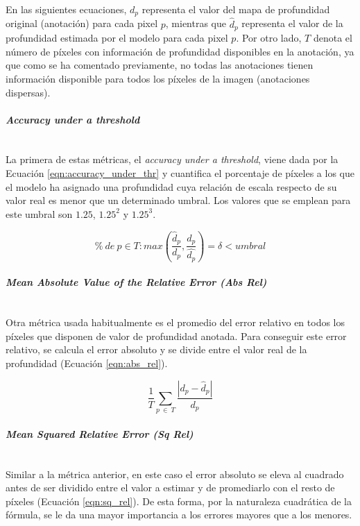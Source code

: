 En las siguientes ecuaciones, $d_p$ representa el valor del mapa de profundidad original (anotación) para cada pixel $p$, mientras que $\hat{d}_p$ representa el valor de la profundidad estimada por el modelo para cada pixel $p$. Por otro lado, $T$ denota el número de píxeles con información de profundidad disponibles en la anotación, ya que como se ha comentado previamente, no todas las anotaciones tienen información disponible para todos los píxeles de la imagen (anotaciones dispersas).


\paragraph{\textit{Accuracy under a threshold}}\mbox{}\\
La primera de estas métricas, el \textit{accuracy under a threshold}, viene dada por la Ecuación \ref{eqn:accuracy_under_thr} y cuantifica el porcentaje de píxeles a los que el modelo ha asignado una profundidad cuya relación de escala respecto de su valor real es menor que un determinado umbral. Los valores que se emplean para este umbral son $1.25$, $1.25^2$ y $1.25^3$.

\begin{equation}
\label{eqn:accuracy_under_thr}
\% \ de \ p \in T : max(\frac{\hat{d}_p}{d_p},\frac{d_p}{\hat{d_p}}) = \delta < umbral 
\end{equation}

\paragraph{\textit{Mean Absolute Value of the Relative Error (Abs Rel)}}\mbox{}\\
Otra métrica usada habitualmente es el promedio del error relativo en todos los píxeles que disponen de valor de profundidad anotada. Para conseguir este error relativo, se calcula el error absoluto y se divide entre el valor real de la profundidad (Ecuación \ref{eqn:abs_rel}).

\begin{equation}
\label{eqn:abs_rel}
\frac{1}{T}\sum_{p\ \in\ T} \frac{|d_p - \hat{d}_p|}{d_p}
\end{equation}

\paragraph{\textit{Mean Squared Relative Error (Sq Rel)}}\mbox{}\\
Similar a la métrica anterior, en este caso el error absoluto se eleva al cuadrado antes de ser dividido entre el valor a estimar y de promediarlo con el resto de píxeles (Ecuación \ref{eqn:sq_rel}). De esta forma, por la naturaleza cuadrática de la fórmula, se le da una mayor importancia a los errores mayores que a los menores.

